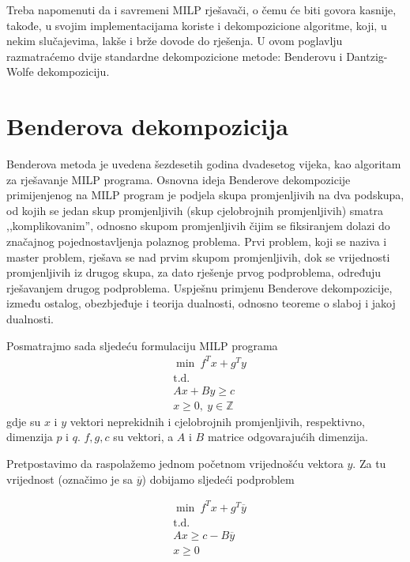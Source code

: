 \documentclass[b5paper, utf8, 11pt, colorlinks]{book}
\theoremstyle{definition}
\begin{document}
Treba napomenuti da i savremeni MILP rješavači, o čemu će biti govora kasnije, takođe, u svojim implementacijama koriste i dekompozicione algoritme, koji, u nekim slučajevima, lakše i brže dovode do rješenja. U ovom poglavlju razmatraćemo dvije standardne dekompozicione metode: Benderovu i Dantzig-Wolfe dekompoziciju.
 
 \section{Benderova dekompozicija}
 
 Benderova metoda je uvedena šezdesetih godina dvadesetog vijeka, kao algoritam za rješavanje MILP programa. 
 Osnovna ideja Benderove dekompozicije primijenjenog na MILP program je podjela skupa promjenljivih na dva podskupa, od kojih se jedan skup promjenljivih (skup cjelobrojnih promjenljivih) smatra ,,komplikovanim'', odnosno skupom promjenljivih čijim se fiksiranjem dolazi do značajnog pojednostavljenja polaznog problema. Prvi problem, koji se naziva i master problem,  rješava se nad prvim skupom promjenljivih, dok se vrijednosti promjenljivih iz drugog skupa,  za dato rješenje prvog podproblema, određuju rješavanjem drugog podproblema. Uspješnu primjenu Benderove dekompozicije, između ostalog, obezbjeđuje i teorija dualnosti, odnosno teoreme o slaboj i jakoj dualnosti.
 

 Posmatrajmo sada sljedeću formulaciju MILP programa
\begin{equation}
 \begin{aligned}\label{bender1}
  &\min\  f^Tx+g^Ty\\
 & \mbox{t.d.}\\
  &Ax+By\geqslant c\\
 &x\geqslant 0,\ y \in \mathbb{Z}
 \end{aligned}
\end{equation}
 gdje su $x$ i $y$ vektori neprekidnih i cjelobrojnih promjenljivih, respektivno, dimenzija $p$ i $q$. $f,g,c$ su vektori, a $A$ i $B$ matrice odgovarajućih dimenzija. 
 
 Pretpostavimo da raspolažemo jednom početnom vrijednošću vektora $y$. Za tu vrijednost (označimo je sa $\overline{y}$) dobijamo sljedeći podproblem

\begin{equation}
	\begin{aligned}\label{bender2}
 			&\min\  f^Tx+g^T\overline{y}\\
 		& \mbox{t.d.}\\
 		& Ax\geqslant c-B\overline{y}\\
 		& x\geqslant 0
 \end{aligned}
\end{equation}
\end{document}
